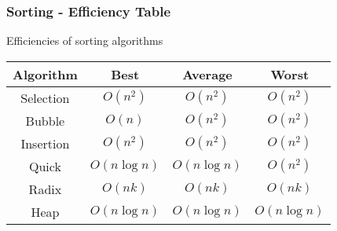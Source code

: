 %

\begin{frame}\frametitle{Sorting - Efficiency Table}
Efficiencies of sorting algorithms
\begin{center}
\begin{tabular}{|c|c|c|c|}
\hline Algorithm & Best & Average & Worst\\\hline
Selection & $O(n^2)$ & $O(n^2)$ & $O(n^2)$\\\hline
Bubble & $O(n)$ & $O(n^2)$ & $O(n^2)$\\\hline
Insertion & $O(n^2)$ & $O(n^2)$ & $O(n^2)$\\\hline
Quick & $O(n\log n)$ & $O(n\log n)$ & $O(n^2)$\\\hline
Radix & $O(nk)$ & $O(nk)$ & $O(nk)$\\\hline
Heap & $O(n\log n)$ & $O(n\log n)$ & $O(n\log n)$\\\hline
\end{tabular}
\end{center}
\end{frame}

